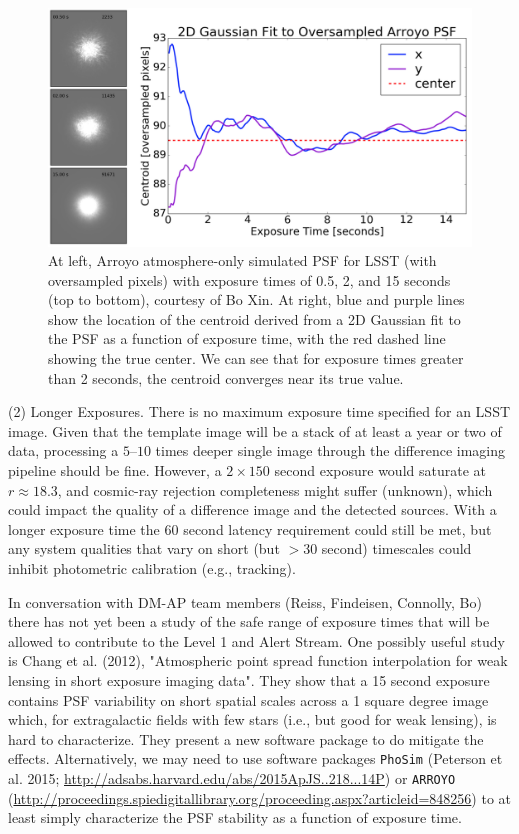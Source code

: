 \documentclass[DM,lsstdraft,toc]{lsstdoc}
\begin{document}
\begin{figure}
\begin{center}
\includegraphics[width=14cm,trim={0cm 0cm 0cm 0cm}, clip]{figures/exptime.png}
\caption{At left, Arroyo atmosphere-only simulated PSF for LSST (with oversampled pixels) with exposure times of 0.5, 2, and 15 seconds (top to bottom), courtesy of Bo Xin. At right, blue and purple lines show the location of the centroid derived from a 2D Gaussian fit to the PSF as a function of exposure time, with the red dashed line showing the true center. We can see that for exposure times greater than 2 seconds, the centroid converges near its true value. \label{fig:expt}}
\end{center}
\end{figure}

(2) Longer Exposures. There is no maximum exposure time specified for an LSST image. Given that the template image will be a stack of at least a year or two of data, processing a $5$--$10$ times deeper single image through the difference imaging pipeline should be fine. However, a $2\times150$ second exposure would saturate at $r \approx 18.3$, and cosmic-ray rejection completeness might suffer (unknown), which could impact the quality of a difference image and the detected sources. With a longer exposure time the $60$ second latency requirement could still be met, but any system qualities that vary on short (but $>30$ second) timescales could inhibit photometric calibration (e.g., tracking). 

In conversation with DM-AP team members (Reiss, Findeisen, Connolly, Bo) there has not yet been a study of the safe range of exposure times that will be allowed to contribute to the Level 1 and Alert Stream. One possibly useful study is Chang et al. (2012), "Atmospheric point spread function interpolation for weak lensing in short exposure imaging data". They show that a 15 second exposure contains PSF variability on short spatial scales across a 1 square degree image which, for extragalactic fields with few stars (i.e., but good for weak lensing), is hard to characterize. They present a new software package to do mitigate the effects. Alternatively, we may need to use software packages {\tt PhoSim} (Peterson et al. 2015; \url{http://adsabs.harvard.edu/abs/2015ApJS..218...14P}) or {\tt ARROYO} (\url{http://proceedings.spiedigitallibrary.org/proceeding.aspx?articleid=848256}) to at least simply characterize the PSF stability as a function of exposure time.
\end{document}
